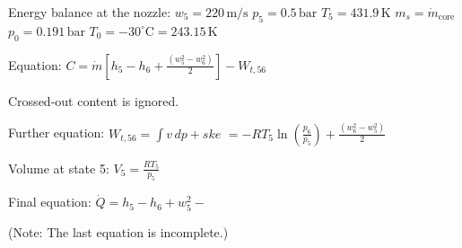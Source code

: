 Energy balance at the nozzle:  
\( w_5 = 220 \, \text{m/s} \)  
\( p_5 = 0.5 \, \text{bar} \)  
\( T_5 = 431.9 \, \text{K} \)  
\( m_s = \dot{m}_\text{core} \)  
\( p_0 = 0.191 \, \text{bar} \)  
\( T_0 = -30^\circ \text{C} = 243.15 \, \text{K} \)  

Equation:  
\( C = \dot{m} \left[ h_5 - h_6 + \frac{(w_5^2 - w_6^2)}{2} \right] - W_{t,56} \)  

Crossed-out content is ignored.  

Further equation:  
\( W_{t,56} = \int v \, dp + ske \)  
\( = -RT_5 \ln \left( \frac{p_6}{p_5} \right) + \frac{(w_6^2 - w_5^2)}{2} \)  

Volume at state 5:  
\( V_5 = \frac{RT_5}{p_5} \)  

Final equation:  
\( \dot{Q} = h_5 - h_6 + w_5^2 - \)  

(Note: The last equation is incomplete.)